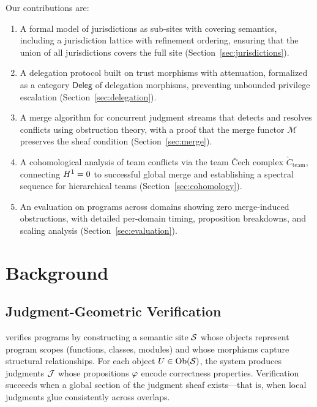 \documentclass[11pt]{article}
\newcommand{\DelegCat}{\mathsf{Deleg}}
\newcommand{\MergeFun}{\mathcal{M}}
\newcommand{\TeamCech}{\check{C}_{\mathrm{team}}}
\begin{document}
Our contributions are:
\begin{enumerate}[leftmargin=*]
  \item A formal model of jurisdictions as sub-sites with covering semantics,
        including a jurisdiction lattice with refinement ordering, ensuring that
        the union of all jurisdictions covers the full site
        (Section~\ref{sec:jurisdictions}).
  \item A delegation protocol built on trust morphisms with attenuation,
        formalized as a category $\DelegCat$ of delegation morphisms,
        preventing unbounded privilege escalation
        (Section~\ref{sec:delegation}).
  \item A merge algorithm for concurrent judgment streams that detects and
        resolves conflicts using obstruction theory, with a proof that the
        merge functor $\MergeFun$ preserves the sheaf condition
        (Section~\ref{sec:merge}).
  \item A cohomological analysis of team conflicts via the team \v{C}ech
        complex $\TeamCech$, connecting $H^{1} = 0$ to successful global
        merge and establishing a spectral sequence for hierarchical teams
        (Section~\ref{sec:cohomology}).
  \item An evaluation on \expTotalPrograms{} programs across \expDomainCount{}
        domains showing zero merge-induced obstructions, with detailed
        per-domain timing, proposition breakdowns, and scaling analysis
        (Section~\ref{sec:evaluation}).
\end{enumerate}

\section{Background}\label{sec:background}

\subsection{Judgment-Geometric Verification}

\JuGeo{} verifies programs by constructing a semantic site $\mathcal{S}$ whose objects
represent program scopes (functions, classes, modules) and whose morphisms
capture structural relationships. For each object $U \in \mathrm{Ob}(\mathcal{S})$, the
system produces judgments $\mathcal{J}$ whose propositions $\varphi$ encode correctness
properties. Verification succeeds when a global section of the judgment sheaf
exists---that is, when local judgments glue consistently across overlaps.
\end{document}
